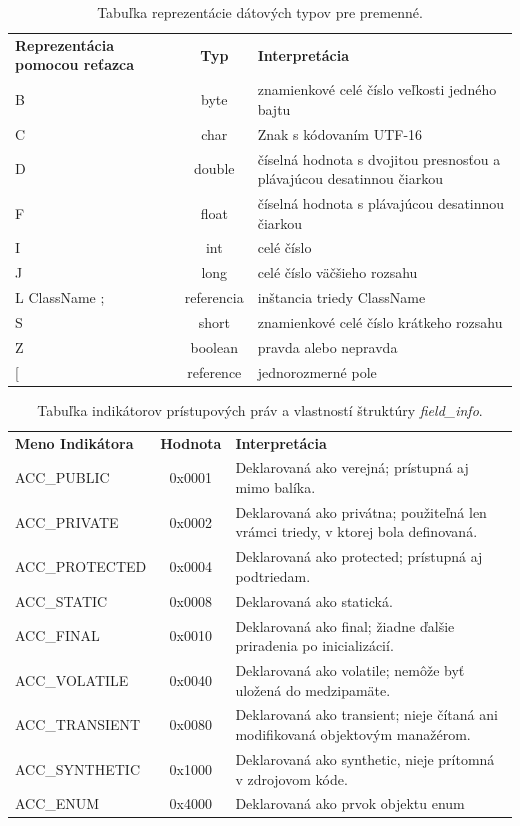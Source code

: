 \documentclass[11pt,final,oneside]{fithesis}
\begin{document}
\begin{table}
  \begin{tabular}{| p{3cm} | c | p{} |}
    \hline
    \textbf{Reprezentácia pomocou reťazca} & \textbf{Typ} & 
    \textbf{Interpretácia} \\
    \hhline{|=|=|=|}
     B & byte &  znamienkové celé číslo veľkosti jedného bajtu \\ \hline
     C & char & Znak s kódovaním UTF-16 \\ \hline
     D & double & číselná hodnota s dvojitou presnosťou a plávajúcou
     desatinnou čiarkou \\ \hline
     F & float & číselná hodnota s plávajúcou desatinnou čiarkou \\ \hline
     I & int & celé číslo \\ \hline
     J & long & celé číslo väčšieho rozsahu \\ \hline
     L ClassName ; & referencia & inštancia triedy ClassName \\ \hline
     S & short & znamienkové celé číslo krátkeho rozsahu \\ \hline
     Z & boolean & pravda alebo nepravda \\ \hline
     [ & reference & jednorozmerné pole \\
    \hline
  \end{tabular}
  \caption{Tabuľka reprezentácie dátových typov pre premenné.}
  \label{tab:tab3}
\end{table}

\begin{table}
  \begin{tabular}{| l | c | p{} |}
    \hline
    \textbf{Meno Indikátora} & \textbf{Hodnota} & \textbf{Interpretácia} \\
    \hhline{|=|=|=|}
    ACC\_PUBLIC & 0x0001 & Deklarovaná ako verejná; prístupná aj mimo balíka.
    \\ \hline
    ACC\_PRIVATE & 0x0002 & Deklarovaná ako privátna; použiteľná len vrámci 
    triedy, v ktorej bola definovaná. \\ \hline
    ACC\_PROTECTED & 0x0004 & Deklarovaná ako protected; prístupná aj 
    podtriedam. \\ \hline
    ACC\_STATIC & 0x0008 & Deklarovaná ako statická. \\ \hline
    ACC\_FINAL & 0x0010 & Deklarovaná ako final; žiadne ďalšie priradenia po
    inicializácií. \\ \hline
    ACC\_VOLATILE & 0x0040 & Deklarovaná ako volatile; nemôže byť uložená do
    medzipamäte. \\ \hline
    ACC\_TRANSIENT & 0x0080 & Deklarovaná ako transient; nieje čítaná ani
    modifikovaná objektovým manažérom. \\ \hline
    ACC\_SYNTHETIC & 0x1000 & Deklarovaná ako synthetic, nieje prítomná v
    zdrojovom kóde. \\ \hline
    ACC\_ENUM & 0x4000 & Deklarovaná ako prvok objektu enum \\
    \hline
  \end{tabular}
  \caption{Tabuľka indikátorov prístupových práv a vlastností štruktúry
  \textit {field\_info}.}
  \label{tab:tab4}
\end{table}
\end{document}

